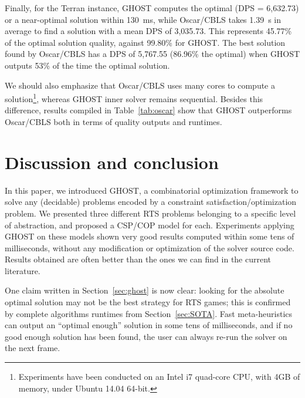 \documentclass[journal]{IEEEtran}
\newcommand{\minormod}[1]{\color{red} #1\color{black} \xspace}
\newcommand{\csp}{\textsc{CSP}\xspace}
\newcommand{\cop}{\textsc{COP}\xspace}
\newcommand{\ghost}{\textsc{GHOST}\xspace}
\begin{document}
Finally, for  the Terran instance,  \ghost computes the optimal  (DPS =
6,632.73) or  a near-optimal  solution within 130~ms,  while Oscar/CBLS
takes 1.39~s in average to find a solution with a mean DPS of 3,035.73.
This  represents  45.77\% of  the  optimal  solution quality,  against
99.80\% for \ghost. The best solution found by Oscar/CBLS has a DPS of
5,767.55 (86.96\%  the optimal) when  \ghost outputs 53\% of  the time
the optimal solution.

We should also emphasize that Oscar/CBLS uses many cores to compute a solution\footnote{Experiments have been conducted on an Intel i7 quad-core CPU, with 4GB of memory, under Ubuntu 14.04 64-bit.}, whereas \ghost inner solver remains sequential. Besides this difference, results compiled in Table~\ref{tab:oscar} show that \ghost outperforms Oscar/CBLS both in terms of quality outputs and runtimes.



\section{Discussion and conclusion}\label{sec:conclusion}

In this paper, we introduced \ghost, a combinatorial optimization
framework to solve any \minormod{(decidable)} problems encoded by a constraint
satisfaction/optimization problem.  We presented three different RTS
problems belonging to a specific level of abstraction, and proposed a
\csp/\cop model for each. Experiments applying \ghost on these models
shown very good results computed within some tens of milliseconds,
without any modification or optimization of the solver source
code. Results obtained are often better than the ones we can find in
the current literature.

One claim written in Section~\ref{sec:ghost} is now clear: looking for
the absolute  optimal solution may  not be  the best strategy  for RTS
games; this is confirmed by complete algorithms runtimes from Section~\ref{sec:SOTA}.  Fast  meta-heuristics  can  output an  ``optimal
enough'' solution in some tens of  milliseconds, and if no good enough
solution has been found, the user can always re-run the solver on the
next frame.   %

\end{document}
